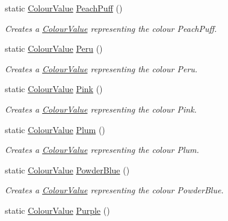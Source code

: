 \begin{DoxyCompactItemize}
static \hyperlink{classMezzanine_1_1ColourValue}{ColourValue} \hyperlink{classMezzanine_1_1ColourValue_a8c3c450e6e9bd9ae8855b930c6ca225b}{PeachPuff} ()
\begin{DoxyCompactList}\small\item\em Creates a \hyperlink{classMezzanine_1_1ColourValue}{ColourValue} representing the colour PeachPuff. \item\end{DoxyCompactList}\item 
static \hyperlink{classMezzanine_1_1ColourValue}{ColourValue} \hyperlink{classMezzanine_1_1ColourValue_aee30665bf534af21810f9fa0d9d7306b}{Peru} ()
\begin{DoxyCompactList}\small\item\em Creates a \hyperlink{classMezzanine_1_1ColourValue}{ColourValue} representing the colour Peru. \item\end{DoxyCompactList}\item 
static \hyperlink{classMezzanine_1_1ColourValue}{ColourValue} \hyperlink{classMezzanine_1_1ColourValue_ac89db9be683d4ffd07b871a892b74351}{Pink} ()
\begin{DoxyCompactList}\small\item\em Creates a \hyperlink{classMezzanine_1_1ColourValue}{ColourValue} representing the colour Pink. \item\end{DoxyCompactList}\item 
static \hyperlink{classMezzanine_1_1ColourValue}{ColourValue} \hyperlink{classMezzanine_1_1ColourValue_a55bdbb7ca7cbd989b2b91babd37aac0b}{Plum} ()
\begin{DoxyCompactList}\small\item\em Creates a \hyperlink{classMezzanine_1_1ColourValue}{ColourValue} representing the colour Plum. \item\end{DoxyCompactList}\item 
static \hyperlink{classMezzanine_1_1ColourValue}{ColourValue} \hyperlink{classMezzanine_1_1ColourValue_a4de5aca49fd056f058200438fa7c8ca5}{PowderBlue} ()
\begin{DoxyCompactList}\small\item\em Creates a \hyperlink{classMezzanine_1_1ColourValue}{ColourValue} representing the colour PowderBlue. \item\end{DoxyCompactList}\item 
static \hyperlink{classMezzanine_1_1ColourValue}{ColourValue} \hyperlink{classMezzanine_1_1ColourValue_a3b58cc37a5b4867959a7191400ffe3d1}{Purple} ()

\end{DoxyCompactItemize}
